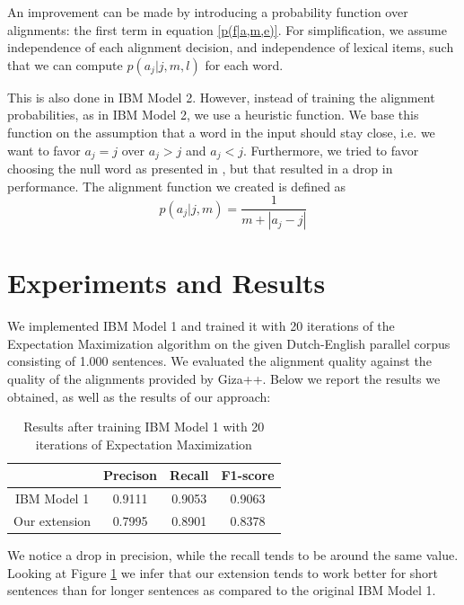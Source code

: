 \documentclass[11pt]{article}
\begin{document}
An improvement can be made by introducing a probability function over alignments: the first term in equation \ref{p(f|a,m,e)}.
For simplification, we assume independence of each alignment decision, and independence of lexical items, such that we can compute $p(a_j|j,m,l)$ for each word.

This is also done in IBM Model 2. However,  instead of training the alignment probabilities, as in IBM Model 2, we use a heuristic function. We base this function on the assumption that a word in the input should stay close, i.e. we want to favor $a_j=j$ over $a_j>j$ and $a_j<j$. Furthermore, we tried to favor choosing the null word as presented in \cite{Moore:2004}, but that resulted in a drop in performance. The alignment function we created is defined as 
\begin{equation}
p(a_j|j,m) = \frac{1}{m+|a_j-j|}
\end{equation}

\section{Experiments and Results}
\label{Eval}
We implemented IBM Model 1 and trained it with 20 iterations of the Expectation Maximization algorithm on the given Dutch-English parallel corpus consisting of 1.000 sentences. We evaluated the alignment quality against the quality of the alignments provided by Giza++. Below we report the results we obtained, as well as the results of our approach:

\begin{table}[h]
\centering
\begin{tabular}{|c | c | c | c |}
  \hline
  & \textbf{Precison} & \textbf{Recall} & \textbf{F1-score} \\
  \hline 
  IBM Model 1 & 0.9111 & 0.9053 & 0.9063\\
  Our extension & 0.7995 & 0.8901 & 0.8378\\
  \hline
\end{tabular}
\caption{Results after training IBM Model 1 with 20 iterations of Expectation Maximization }
\label{results}
\end{table}

We notice a drop in precision, while the recall tends to be around the same value. Looking at Figure \ref{results} we infer that our extension tends to work better for short sentences than for longer sentences as compared to the original IBM Model 1.
\end{document}
